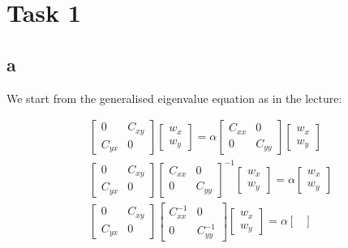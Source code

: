 \section*{Task 1}

\subsection*{a}

We start from the generalised eigenvalue equation as in the lecture:

\begin{gather*}
 \begin{bmatrix}
0 & C_{xy} \\
C_{yx} & 0
\end{bmatrix}
 \begin{bmatrix}
w_x \\
w_y
\end{bmatrix}
= \alpha
 \begin{bmatrix}
C_{xx} & 0 \\
0 & C_{yy}
\end{bmatrix}
 \begin{bmatrix}
w_x \\
w_y
\end{bmatrix} \\
 \begin{bmatrix}
0 & C_{xy} \\
C_{yx} & 0
\end{bmatrix}
 \begin{bmatrix}
C_{xx} & 0 \\
0 & C_{yy}
\end{bmatrix}^{-1}
 \begin{bmatrix}
w_x \\
w_y
\end{bmatrix}
= \alpha
 \begin{bmatrix}
w_x \\
w_y
\end{bmatrix} \\
 \begin{bmatrix}
0 & C_{xy} \\
C_{yx} & 0
\end{bmatrix}
 \begin{bmatrix}
C_{xx}^{-1} & 0 \\
0 & C_{yy}^{-1}
\end{bmatrix}
 \begin{bmatrix}
w_x \\
w_y
\end{bmatrix}
= \alpha
 \begin{bmatrix}

\end{bmatrix}
\end{gather*}
